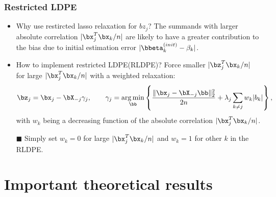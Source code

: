 \begin{frame}
\frametitle{Restricted LDPE}
\begin{itemize}
    \item Why use restircted lasso relaxation for $bz_j$?
    The summands with larger absolute correlation $|\bx_j^T\bx_k/n|$ are likely to have a greater contribution to the bias due to initial estimation error $|\bbeta^{(init)}_k-\beta_k|$.
    \item How to implement restricted LDPE(RLDPE)?
    Force smaller $|\bz_j^T\bx_k/n|$ for large $|\bx_j^T\bx_k/n|$ with a weighted relaxation:
    \begin{equation}
    \bz_j = \bx_j - \bX_{-j}\gamma_j,\qquad \gamma_j = \mathop{\arg\min}_{\bb}\left\{\frac{\|\bx_j-\bX_{-j}\bb\|_2^2}{2n} + \lambda_j\sum_{k\neq j}w_k|b_k|\right\},
    \end{equation}
    with $w_k$ being a decreasing function of the absolute correlation $|\bx_j^T\bx_k/n|$.
    \item[$\blacksquare$] Simply set $w_k=0$ for large $|\bx_j^T\bx_k/n|$ and $w_k=1$ for other $k$ in the RLDPE.
    
\end{itemize}
\end{frame}


\section{Important theoretical results}
\begin{frame}
\sectionpage
\end{frame}


